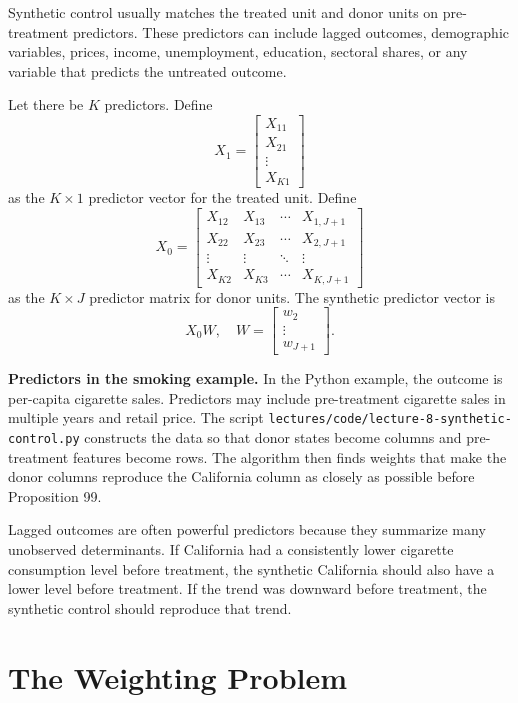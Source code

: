 Synthetic control usually matches the treated unit and donor units on pre-treatment predictors. These predictors can include lagged outcomes, demographic variables, prices, income, unemployment, education, sectoral shares, or any variable that predicts the untreated outcome.

Let there be \(K\) predictors. Define
\[
X_1=
\begin{bmatrix}
X_{11}\\
X_{21}\\
\vdots\\
X_{K1}
\end{bmatrix}
\]
as the \(K\times 1\) predictor vector for the treated unit. Define
\[
X_0=
\begin{bmatrix}
X_{12} & X_{13} & \cdots & X_{1,J+1}\\
X_{22} & X_{23} & \cdots & X_{2,J+1}\\
\vdots & \vdots & \ddots & \vdots\\
X_{K2} & X_{K3} & \cdots & X_{K,J+1}
\end{bmatrix}
\]
as the \(K\times J\) predictor matrix for donor units. The synthetic predictor vector is
\[
X_0W,
\quad
W=
\begin{bmatrix}
w_2\\
\vdots\\
w_{J+1}
\end{bmatrix}.
\]

\begin{exmp}
\textbf{Predictors in the smoking example.} In the Python example, the outcome is per-capita cigarette sales. Predictors may include pre-treatment cigarette sales in multiple years and retail price. The script \texttt{lectures/code/lecture-8-synthetic-control.py} constructs the data so that donor states become columns and pre-treatment features become rows. The algorithm then finds weights that make the donor columns reproduce the California column as closely as possible before Proposition 99.
\end{exmp}

Lagged outcomes are often powerful predictors because they summarize many unobserved determinants. If California had a consistently lower cigarette consumption level before treatment, the synthetic California should also have a lower level before treatment. If the trend was downward before treatment, the synthetic control should reproduce that trend.

\section{The Weighting Problem}

